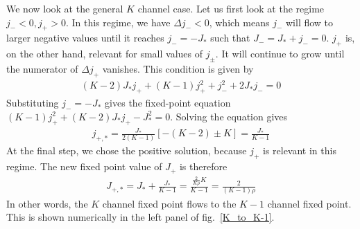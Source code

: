 \documentclass[reprint,prb,superscriptaddress]{revtex4-2}
\begin{document}
We now look at the general \(K\) channel case. Let us first look at the regime \(j_- < 0, j_+ > 0\). In this regime, we have \(\Delta j_- < 0\), which means \(j_-\) will flow to larger negative values until it reaches \(j_- = -J_*\) such that \(J_- = J_* + j_- = 0\). \(j_+\) is, on the other hand, relevant for small values of \(j_\pm\). It will continue to grow until the numerator of \(\Delta j_+\) vanishes. This condition is given by
\begin{align}
	\left(K - 2\right)J_*j_+ + (K-1)j_+^2 + j_-^2 + 2J_* j_- = 0
\end{align}
Substituting \(j_- = -J_*\) gives the fixed-point equation \((K-1)j_+^2 + \left(K - 2\right)J_*j_+ - J_*^2 = 0\). Solving the equation gives
\begin{align}
	j_{+,*} = \frac{J_*}{2(K-1)}\left[-(K-2) \pm K\right] = \frac{J_*}{K-1}
\end{align}
At the final step, we chose the positive solution, because \(j_+\) is relevant in this regime. The new fixed point value of \(J_+\) is therefore
\begin{align}
	J_{+,*} = J_* + \frac{J_*}{K-1} = \frac{\frac{2}{K \rho} K}{K - 1} = \frac{2}{(K-1)\rho}
\end{align}
In other words, the \(K\) channel fixed point flows to the \(K-1\) channel fixed point. This is shown numerically in the left panel of fig.~\ref{K_to_K-1}.\\
\end{document}
